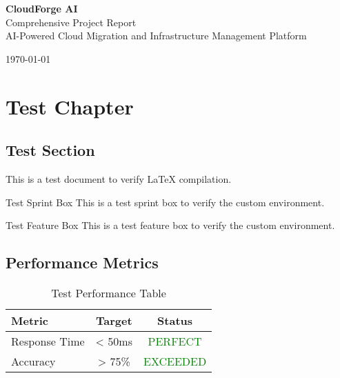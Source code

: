 \documentclass{report}
\begin{document}
\begin{titlepage}
    \centering
    \vspace*{1cm}
    
    {\LARGE\bfseries CloudForge AI}\\[0.5cm]
    {\Large Comprehensive Project Report}\\[0.5cm]
    {\large AI-Powered Cloud Migration and Infrastructure Management Platform}\\[2cm]
    
    \vfill
    
    {\large \today}
\end{titlepage}

\tableofcontents
\newpage

\chapter{Test Chapter}

\section{Test Section}

This is a test document to verify LaTeX compilation.

\begin{sprintbox}{Test Sprint Box}
This is a test sprint box to verify the custom environment.
\end{sprintbox}

\begin{featurebox}{Test Feature Box}
This is a test feature box to verify the custom environment.
\end{featurebox}

\section{Performance Metrics}

\begin{table}[H]
\centering
\caption{Test Performance Table}
\begin{tabular}{|l|c|c|}
\hline
\textbf{Metric} & \textbf{Target} & \textbf{Status} \\
\hline
Response Time & < 50ms & \textcolor{green}{PERFECT} \\
\hline
Accuracy & > 75\% & \textcolor{green}{EXCEEDED} \\
\hline
\end{tabular}
\end{table}
\end{document}
